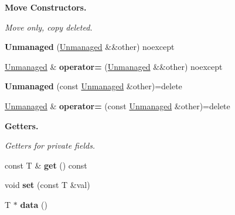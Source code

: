 \begin{Indent}\textbf{ Move Constructors.}\par
{\em Move only, copy deleted. }\begin{DoxyCompactItemize}
\item 
\mbox{\label{classblaze_1_1util_1_1Unmanaged_a887c2d929464c22a9017506d8d252fde}} 
{\bfseries Unmanaged} (\hyperlink{classblaze_1_1util_1_1Unmanaged}{Unmanaged} \&\&other) noexcept
\item 
\mbox{\label{classblaze_1_1util_1_1Unmanaged_aca13c9955f89f999d35af547665f5021}} 
\hyperlink{classblaze_1_1util_1_1Unmanaged}{Unmanaged} \& {\bfseries operator=} (\hyperlink{classblaze_1_1util_1_1Unmanaged}{Unmanaged} \&\&other) noexcept
\item 
\mbox{\label{classblaze_1_1util_1_1Unmanaged_a91256e8f121bae4a16ca982df6169fad}} 
{\bfseries Unmanaged} (const \hyperlink{classblaze_1_1util_1_1Unmanaged}{Unmanaged} \&other)=delete
\item 
\mbox{\label{classblaze_1_1util_1_1Unmanaged_a348036688d4280d1a68797416f4d3097}} 
\hyperlink{classblaze_1_1util_1_1Unmanaged}{Unmanaged} \& {\bfseries operator=} (const \hyperlink{classblaze_1_1util_1_1Unmanaged}{Unmanaged} \&other)=delete
\end{DoxyCompactItemize}
\end{Indent}
\begin{Indent}\textbf{ Getters.}\par
{\em Getters for private fields. }\begin{DoxyCompactItemize}
\item 
\mbox{\label{classblaze_1_1util_1_1Unmanaged_ac5ffb688acfa2843d62e644969cc0f8d}} 
const T \& {\bfseries get} () const
\item 
\mbox{\label{classblaze_1_1util_1_1Unmanaged_a8f0ece0ca74d59f42b396baed6b97483}} 
void {\bfseries set} (const T \&val)
\item 
\mbox{\label{classblaze_1_1util_1_1Unmanaged_a2c4e1f19ec97030d6e83a108facb352d}} 
T $\ast$ {\bfseries data} ()
\end{DoxyCompactItemize}
\end{Indent}


